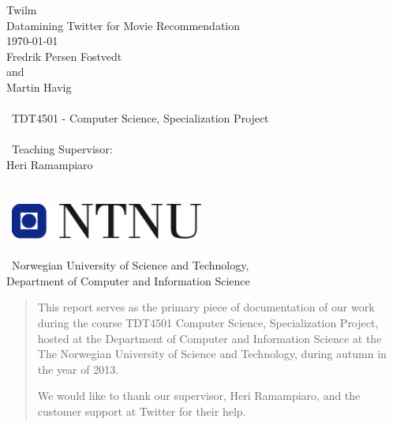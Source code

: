 \documentclass[10pt,a4paper,oneside]{report}
\begin{document}
\thispagestyle{empty}
\begin{center}
	{\Huge Twilm} \\
	\medskip
	{\LARGE Datamining Twitter for Movie Recommendation} \\
    {\large \today \\Fredrik Persen Fostvedt \\ and \\ Martin Havig}
    {\Large \\\ \\\ TDT4501 - Computer Science, Specialization Project}
    {\large \\\ \\\ Teaching Supervisor: \\ Heri Ramampiaro} \\\ \\\ \\\
    \includegraphics[width=2.5in]{image/logo_NTNU.png} \\\ \\\
    {\Large Norwegian University of Science and Technology, \\
    Department of Computer and Information Science} \\
\end{center}
\newpage

\renewcommand{\abstractname}{Acknowledgments}
\begin{abstract}

This report serves as the primary piece of documentation of our work during the course TDT4501 Computer Science, Specialization Project, hosted at the Department of Computer and Information Science at the The Norwegian University of Science and Technology, during autumn in the year of 2013.

We would like to thank our supervisor, Heri Ramampiaro, and the customer support at Twitter for their help.
\end{abstract}
\end{document}
